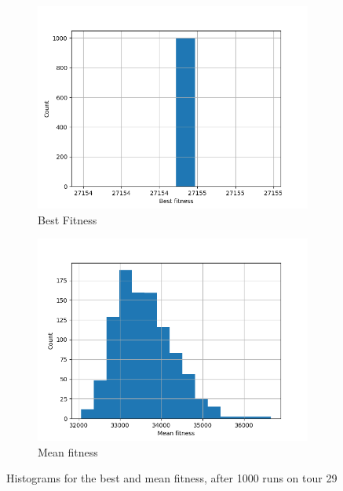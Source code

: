 \documentclass[a4paper,10pt]{article}
\begin{document}
\begin{figure}[H]
    \centering
    \begin{subfigure}[b]{0.40\linewidth}
      \includegraphics[width=\linewidth]{histogram_best_fitness.png}
      \caption[b]{Best Fitness}
      \label{fig:best_histogram}
    \end{subfigure}
    \begin{subfigure}[b]{0.40\linewidth}
          \includegraphics[width=\linewidth]{histogram_mean_fitness.png}
      \caption{Mean fitness}
      \label{fig:mean_histogram}
    \end{subfigure}
    \caption{Histograms for the best and mean fitness, after 1000 runs on tour 29}
    \label{fig:histograms}
\end{figure}
\end{document}
